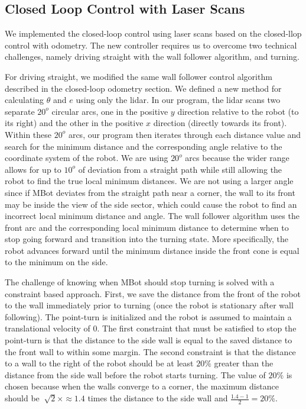 \documentclass[conference]{IEEEtran}
\begin{document}
\subsection{Closed Loop Control with Laser Scans}
We implemented the closed-loop control using laser scans based on the closed-llop control with odometry. The new controller requires us to overcome two technical challenges, namely driving straight with the wall follower algorithm, and turning.

For driving straight, we modified the same wall follower control algorithm described in the closed-loop odometry section. We defined a new method for calculating $\theta$ and $e$ using only the lidar. In our program, the lidar scans two separate $20^{o}$ circular arcs, one in the positive $y$ direction relative to the robot (to its right) and the other in the positive $x$ direction (directly towards its front). Within these $20^{o}$ arcs, our program then iterates through each distance value and search for the minimum distance and the corresponding angle relative to the coordinate system of the robot. We are using $20^{o}$ arcs because the wider range allows for up to $10^{o}$ of deviation from a straight path while still allowing the robot to find the true local minimum distances. We are not using a larger angle since if MBot deviates from the straight path near a corner, the wall to its front may be inside the view of the side sector, which could cause the robot to find an incorrect local minimum distance and angle. The wall follower algorithm uses the front arc and the  corresponding local minimum distance to determine when to stop going forward and transition into the turning state. More specifically, the robot advances forward until the minimum distance inside the front cone is equal to the minimum on the side.

The challenge of knowing when MBot should stop turning is solved with a constraint based approach. First, we save the distance from the front of the robot to the wall immediately prior to turning (once the robot is stationary after wall following). The point-turn is initialized and the robot is assumed to maintain a translational velocity of 0. The first constraint that must be satisfied to stop the point-turn is that the distance to the side wall is equal to the saved distance to the front wall to within some margin. The second constraint is that the distance to a wall to the right of the robot should be at least $20\%$ greater than the distance from the side wall before the robot starts turning. The value of $20\%$ is chosen because when the walls converge to a corner, the maximum distance should be $~\sqrt{2} \times \approx 1.4$ times the distance to the side wall and $\frac{1.4 - 1}{2} = 20\%$.
\end{document}
